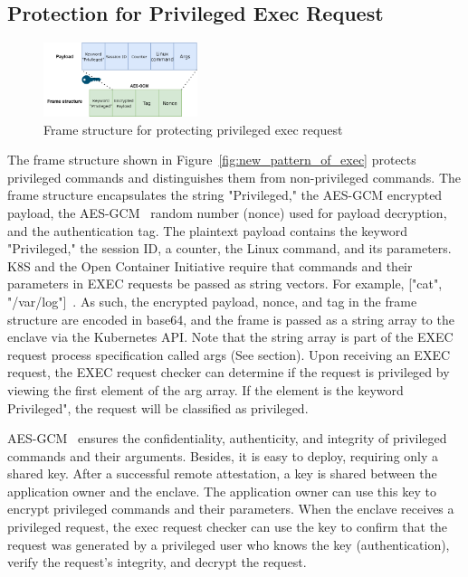 \subsection{Protection for Privileged Exec Request}
\begin{figure}[!htb]
    \centering
    \includegraphics[width=0.4\textwidth]{images/exec_frame.png}
    \caption[Frame structure  for protecting privileged exec request]{Frame structure  for protecting privileged exec request}
    \label{fig:exec_frame}
\end{figure}
The frame structure shown in Figure~\ref{fig:new_pattern_of_exec} protects privileged commands and distinguishes them from non-privileged commands. The frame structure encapsulates the string "Privileged," the AES-GCM encrypted payload, the AES-GCM~\cite*{aes_gcm} random number (nonce) used for payload decryption, and the authentication tag. 
The plaintext payload contains the keyword "Privileged," the session ID, a counter,  the Linux command, and its parameters. K8S and the Open Container Initiative require that commands and their parameters in EXEC requests be passed as string vectors. For example, ["cat", "/var/log"]~\cite*{k8s}. As such, 
the encrypted payload, nonce, and tag in the frame structure are encoded in base64, and the frame is passed as a string array to the enclave via the Kubernetes API. Note that the string array is part of the EXEC request process specification called args (See section). Upon receiving an EXEC request, 
the EXEC request checker can determine if the request is privileged by viewing the first element of the arg array. If the element is the keyword Privileged", the request will be classified as privileged.

AES-GCM~\cite*{aes_gcm} ensures the confidentiality, authenticity, and integrity of privileged commands and their arguments. Besides, it is easy to deploy, requiring only a shared key. After a successful remote attestation, a key is shared between the application owner and the enclave. The application owner can 
use this key to encrypt privileged commands and their parameters. When the enclave receives a privileged request, the exec request checker can use the key to confirm that the request was generated by a privileged user who knows the key (authentication), verify the request's integrity, and decrypt the 
request.


